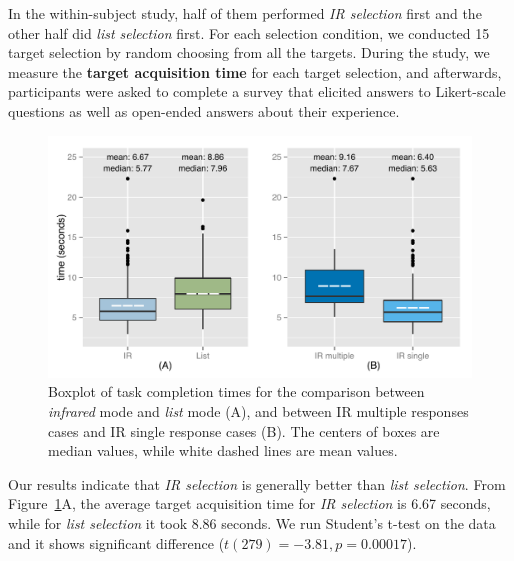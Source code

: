 In the within-subject study, half of them performed {\em IR selection} first and the other half did {\em list selection} first. For each selection condition, we conducted 15 target selection by random choosing from all the targets. During the study, we measure the {\bf target acquisition time} for each target selection, and afterwards, participants were asked to complete a survey that elicited answers to Likert-scale questions as well as open-ended answers about their experience.


\begin{figure}[t]
\centering
\includegraphics[width=1.0\columnwidth]{figures/R_time_by_Category.pdf}
\caption{Boxplot of task completion times for the comparison between {\em infrared} mode and {\em list} mode (A), and between IR multiple responses cases and IR single response cases (B). The centers of boxes are median values, while white dashed lines are mean values.}
\label{fig:selection-time}
\end{figure}

Our results indicate that {\em IR selection} is generally better than {\em list selection}. From Figure~\ref{fig:selection-time}A, the average target acquisition time for {\em IR selection} is 6.67 seconds, while for {\em list selection} it took 8.86 seconds. We run Student's t-test on the data and it shows significant difference ($t(279)=-3.81, p=0.00017$).

